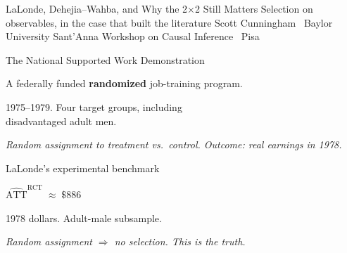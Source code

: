 \documentclass[11pt,aspectratio=169]{beamer}
\begin{document}
\codechellatitle
  {LaLonde, Dehejia--Wahba, and Why the 2$\times$2 Still Matters}
  {Selection on observables, in the case that built the literature}
  {Scott Cunningham \textperiodcentered\ Baylor University}
  {Sant'Anna Workshop on Causal Inference \textperiodcentered\ Pisa}


\begin{frame}{The National Supported Work Demonstration}
\vspace{1em}
\begin{center}
\large
A federally funded \textbf{randomized} job-training program.
\end{center}
\vspace{0.4em}
\begin{center}
\large
1975--1979. Four target groups, including \\[0.2em] disadvantaged adult men.
\end{center}
\vspace{0.6em}
\begin{center}
\small\color{warmgray}\itshape
Random assignment to treatment vs.\ control. \;Outcome: real earnings in 1978.
\end{center}
\end{frame}

\begin{frame}{LaLonde's experimental benchmark}
\vspace{1.6em}
\begin{center}
\Large
$\widehat{\text{ATT}}^{\text{RCT}} \;\approx\; \$886$
\end{center}
\vspace{0.6em}
\begin{center}
1978 dollars. \;Adult-male subsample.
\end{center}
\vspace{1em}
\begin{center}
\small\color{warmgray}\itshape
Random assignment $\Rightarrow$ no selection. \;This is the \textit{truth}.
\end{center}
\end{frame}
\end{document}
